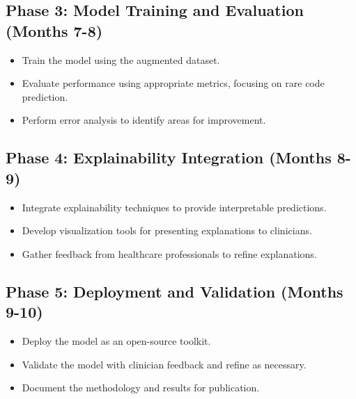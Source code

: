 \subsection{Phase 3: Model Training and Evaluation (Months 7-8)}
\begin{itemize}
    \item Train the model using the augmented dataset.
    \item Evaluate performance using appropriate metrics, focusing on rare code prediction.
    \item Perform error analysis to identify areas for improvement.
\end{itemize}

\subsection{Phase 4: Explainability Integration (Months 8-9)}
\begin{itemize}
    \item Integrate explainability techniques to provide interpretable predictions.
    \item Develop visualization tools for presenting explanations to clinicians.
    \item Gather feedback from healthcare professionals to refine explanations.
\end{itemize}

\subsection{Phase 5: Deployment and Validation (Months 9-10)}
\begin{itemize}
    \item Deploy the model as an open-source toolkit.
    \item Validate the model with clinician feedback and refine as necessary.
    \item Document the methodology and results for publication.
\end{itemize}

